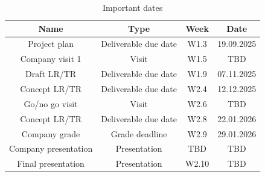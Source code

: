 \documentclass{report}
\begin{document}
		\begin{table}[ht]
			\centering
		\begin{tabular}{|c|c|c|c|}
			\hline
			Name & Type & Week & Date \\
			\hline
			Project plan & Deliverable due date & W1.3 & 19.09.2025 \\
			\hline
			Company visit 1 & Visit & W1.5 & TBD \\
			\hline
			Draft LR/TR & Deliverable due date & W1.9 & 07.11.2025 \\
			\hline
			Concept LR/TR & Deliverable due date & W2.4 & 12.12.2025 \\
			\hline
			Go/no go visit & Visit & W2.6 & TBD \\
			\hline
			Concept LR/TR & Deliverable due date & W2.8 & 22.01.2026 \\
			\hline
			Company grade & Grade deadline & W2.9 & 29.01.2026 \\
			\hline
			Company presentation & Presentation & TBD & TBD \\
			\hline
			Final presentation & Presentation & W2.10 & TBD \\
			\hline
		\end{tabular}
		\caption{Important dates}
		\label{tab:dates}
	\end{table}
		
		
		
	
	
	
	
	
\end{document}
